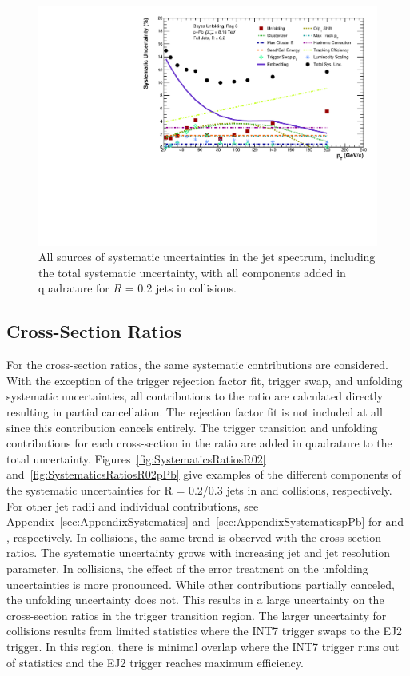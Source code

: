\begin{figure}[hbt!]
    \centering
    \includegraphics[width=15cm]{figures/pPbFigures/Systematics/TotalSystematics_R02.pdf}
    \caption{All sources of systematic uncertainties in the jet spectrum, including the total systematic uncertainty, with all components added in quadrature for $R$ = 0.2 jets in \pPb collisions.}
    \label{fig:SystematicsSpectraR02pPb}
\end{figure}

\subsection{Cross-Section Ratios}
\label{sec:SystematicsRatios}

For the cross-section ratios, the same systematic contributions are considered. With the exception of the trigger rejection factor fit, trigger swap, and unfolding systematic uncertainties, all contributions to the ratio are calculated directly resulting in partial cancellation. The rejection factor fit is not included at all since this contribution cancels entirely. The trigger transition and unfolding contributions for each cross-section in the ratio are added in quadrature to the total uncertainty. Figures~\ref{fig:SystematicsRatiosR02} and~\ref{fig:SystematicsRatiosR02pPb} give examples of the different components of the systematic uncertainties for R = 0.2/0.3 jets in \pp and \pPb collisions, respectively. For other jet radii and individual contributions, see Appendix~\ref{sec:AppendixSystematics} and~\ref{sec:AppendixSystematicspPb} for \pp and \pPb, respectively. In \pp collisions, the same trend is observed with the cross-section ratios. The systematic uncertainty grows with increasing jet \pT and jet resolution parameter. In \pPb collisions, the effect of the error treatment on the unfolding uncertainties is more pronounced. While other contributions partially canceled, the unfolding uncertainty does not. This results in a large uncertainty on the cross-section ratios in the trigger transition region. The larger uncertainty for \pPb collisions results from limited statistics where the INT7 trigger swaps to the EJ2 trigger. In this region, there is minimal overlap where the INT7 trigger runs out of statistics and the EJ2 trigger reaches maximum efficiency.


